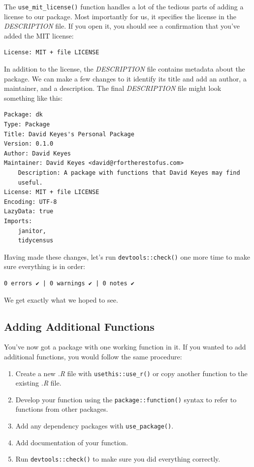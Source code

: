 \documentclass[
]{book}
\begin{document}
The \texttt{use\_mit\_license()} function handles a lot of the tedious parts of adding a license to our package. Most importantly for us, it specifies the license in the \emph{DESCRIPTION} file. If you open it, you should see a confirmation that you've added the MIT license:

\begin{verbatim}
License: MIT + file LICENSE
\end{verbatim}

In addition to the license, the \emph{DESCRIPTION} file contains metadata about the package. We can make a few changes to it identify its title and add an author, a maintainer, and a description. The final \emph{DESCRIPTION} file might look something like this:

\begin{verbatim}
Package: dk
Type: Package
Title: David Keyes's Personal Package
Version: 0.1.0
Author: David Keyes
Maintainer: David Keyes <david@rfortherestofus.com>
    Description: A package with functions that David Keyes may find 
    useful.
License: MIT + file LICENSE
Encoding: UTF-8
LazyData: true
Imports: 
    janitor,
    tidycensus
\end{verbatim}

Having made these changes, let's run \texttt{devtools::check()} one more time to make sure everything is in order:

\begin{verbatim}
0 errors ✔ | 0 warnings ✔ | 0 notes ✔
\end{verbatim}

We get exactly what we hoped to see.

\hypertarget{adding-additional-functions}{%
\subsection*{Adding Additional Functions}\label{adding-additional-functions}}

You've now got a package with one working function in it. If you wanted to add additional functions, you would follow the same procedure:

\begin{enumerate}
\def\labelenumi{\arabic{enumi}.}
\item
  Create a new \emph{.R} file with \texttt{usethis::use\_r()} or copy another function to the existing \emph{.R} file.
\item
  Develop your function using the \texttt{package::function()} syntax to refer to functions from other packages.
\item
  Add any dependency packages with \texttt{use\_package()}.
\item
  Add documentation of your function.
\item
  Run \texttt{devtools::check()} to make sure you did everything correctly.
\end{enumerate}
\end{document}
